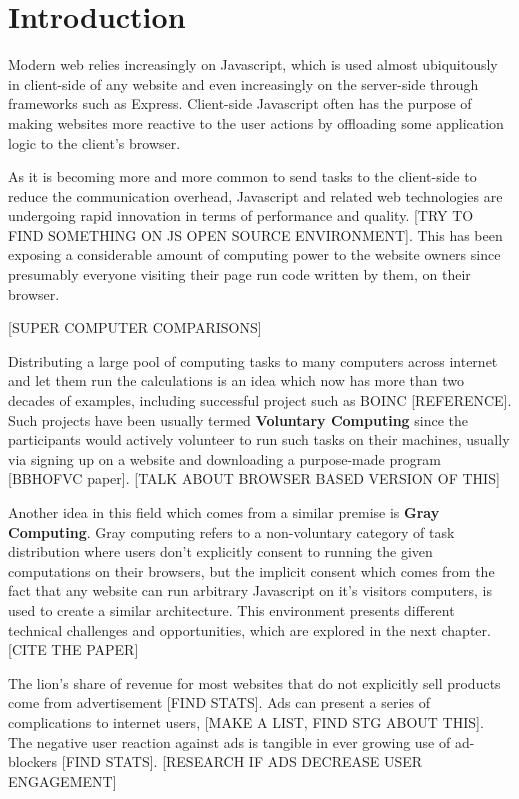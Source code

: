 \chapter{Introduction}
Modern web relies increasingly on Javascript, which is used almost ubiquitously in client-side of any website and even increasingly on the server-side through frameworks such as Express. Client-side Javascript often has the purpose of making websites more reactive to the user actions by offloading some application logic to the client's browser. 

As it is becoming more and more common to send tasks to the client-side to reduce the communication overhead, Javascript and related web technologies are undergoing rapid innovation in terms of performance and quality. [TRY TO FIND SOMETHING ON JS OPEN SOURCE ENVIRONMENT]. This has been exposing a considerable amount of computing power to the website owners since presumably everyone visiting their page run code written by them, on their browser.

[SUPER COMPUTER COMPARISONS]


Distributing a large pool of computing tasks to many computers across internet and let them run the calculations is an idea which now has more than two decades of examples, including successful project such as BOINC [REFERENCE]. Such projects have been usually termed \textbf{Voluntary Computing} since the participants would actively volunteer to run such tasks on their machines, usually via signing up on a website and downloading a purpose-made program [BBHOFVC paper]. [TALK ABOUT BROWSER BASED VERSION OF THIS]

Another idea in this field which comes from a similar premise is \textbf{Gray Computing}. Gray computing refers to a non-voluntary category of task distribution where users don't explicitly consent to running the given computations on their browsers, but the implicit consent which comes from the fact that any website can run arbitrary Javascript on it's visitors computers, is used to create a similar architecture. This environment presents different technical challenges and opportunities, which are explored in the next chapter.
[CITE THE PAPER]

The lion's share of revenue for most websites that do not explicitly sell products come from advertisement [FIND STATS]. Ads can present a series of complications to internet users, [MAKE A LIST, FIND STG ABOUT THIS]. The negative user reaction against ads is tangible in ever growing use of ad-blockers [FIND STATS]. [RESEARCH IF ADS DECREASE USER ENGAGEMENT]

